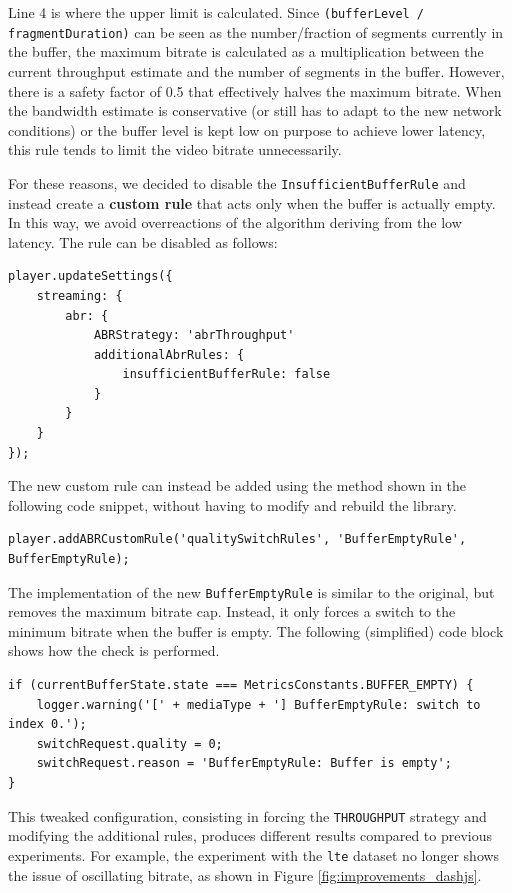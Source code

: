Line 4 is where the upper limit is calculated. Since \texttt{(bufferLevel / fragmentDuration)} can be seen as the number/fraction of segments currently in the buffer, the maximum bitrate is calculated as a multiplication between the current throughput estimate and the number of segments in the buffer. However, there is a safety factor of 0.5 that effectively halves the maximum bitrate. When the bandwidth estimate is conservative (or still has to adapt to the new network conditions) or the buffer level is kept low on purpose to achieve lower latency, this rule tends to limit the video bitrate unnecessarily.

For these reasons, we decided to disable the \texttt{InsufficientBufferRule} and instead create a \textbf{custom rule} that acts only when the buffer is actually empty. In this way, we avoid overreactions of the algorithm deriving from the low latency. The rule can be disabled as follows:

\begin{verbatim}
player.updateSettings({
    streaming: {
        abr: {
            ABRStrategy: 'abrThroughput'
            additionalAbrRules: {
                insufficientBufferRule: false
            }
        }
    }
});
\end{verbatim}

The new custom rule can instead be added using the method shown in the following code snippet, without having to modify and rebuild the library.

\begin{verbatim}
player.addABRCustomRule('qualitySwitchRules', 'BufferEmptyRule', BufferEmptyRule);
\end{verbatim}

The implementation of the new \texttt{BufferEmptyRule} is similar to the original, but removes the maximum bitrate cap. Instead, it only forces a switch to the minimum bitrate when the buffer is empty. The following (simplified) code block shows how the check is performed.

\begin{verbatim}
if (currentBufferState.state === MetricsConstants.BUFFER_EMPTY) {
    logger.warning('[' + mediaType + '] BufferEmptyRule: switch to index 0.');
    switchRequest.quality = 0;
    switchRequest.reason = 'BufferEmptyRule: Buffer is empty';
}
\end{verbatim}

This tweaked configuration, consisting in forcing the \texttt{THROUGHPUT} strategy and modifying the additional rules, produces different results compared to previous experiments. For example, the experiment with the \texttt{lte} dataset no longer shows the issue of oscillating bitrate, as shown in Figure \ref{fig:improvements_dashjs}.

